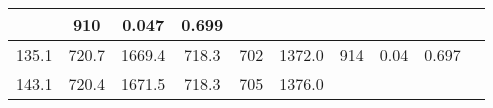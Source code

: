 \documentclass[a4paper,10pt]{article}
\begin{document}
\begin{longtable}{
     |
%    
    c|
%    
    c|
%    
    c|
%    
    c|
%    
    c|
%    
    c|
%    
    c|
%    
    c|
%    
    c|
%    
    c|
%    
    }
%        
        & 910
%        

%        

%        
        & 0.047
%        

%        

%        
        & 0.699
%        

%        
        \\
        \hline

        

%        

%        
        135.1
%        

%        

%        
        & 720.7
%        

%        

%        
        & 1669.4
%        

%        

%        
        & 718.3
%        

%        

%        
        & 702
%        

%        

%        
        & 1372.0
%        

%        

%        
        & 914
%        

%        

%        
        & 0.04
%        

%        

%        
        & 0.697
%        

%        
        \\
        \hline

        

%        

%        
        143.1
%        

%        

%        
        & 720.4
%        

%        

%        
        & 1671.5
%        

%        

%        
        & 718.3
%        

%        

%        
        & 705
%        

%        

%        
        & 1376.0
%        

%        


\end{longtable}
\end{document}
